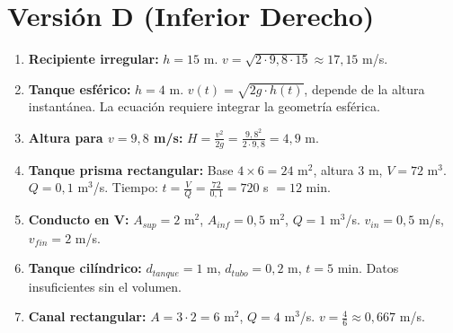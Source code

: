 \documentclass[a4paper,11pt]{article}
\begin{document}
\newpage

\section*{Versión D (Inferior Derecho)}

\begin{enumerate}
  \item \textbf{Recipiente irregular:} $h=15$ m. $v=\sqrt{2\cdot9,8\cdot15}\approx17,15$ m/s.
  \item \textbf{Tanque esférico:} $h=4$ m. $v(t)=\sqrt{2g\cdot h(t)}$, depende de la altura instantánea. La ecuación requiere integrar la geometría esférica.
  \item \textbf{Altura para $v=9,8$ m/s:} $H=\frac{v^2}{2g}=\frac{9,8^2}{2\cdot9,8}=4,9$ m.
  \item \textbf{Tanque prisma rectangular:} Base $4\times6=24$ m$^2$, altura 3 m, $V=72$ m$^3$. $Q=0,1$ m$^3$/s. Tiempo: $t=\frac{V}{Q}=\frac{72}{0,1}=720$ s $=12$ min.
  \item \textbf{Conducto en V:} $A_{sup}=2$ m$^2$, $A_{inf}=0,5$ m$^2$, $Q=1$ m$^3$/s. $v_{in}=0,5$ m/s, $v_{fin}=2$ m/s.
  \item \textbf{Tanque cilíndrico:} $d_{tanque}=1$ m, $d_{tubo}=0,2$ m, $t=5$ min. Datos insuficientes sin el volumen.
  \item \textbf{Canal rectangular:} $A=3\cdot2=6$ m$^2$, $Q=4$ m$^3$/s. $v=\frac{4}{6}\approx0,667$ m/s.
\end{enumerate}
\end{document}
